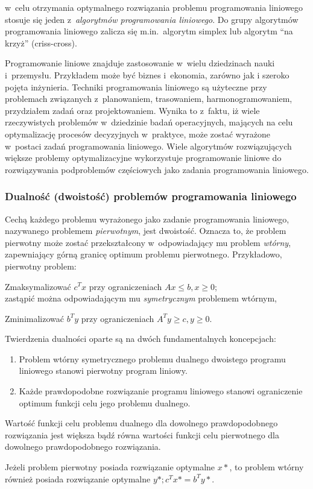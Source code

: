 \par{
  w~celu otrzymania optymalnego rozwiązania problemu programowania liniowego
  stosuje się jeden z~\emph{algorytmów programowania liniowego}.
  Do grupy algorytmów programowania liniowego zalicza się m.in.\ algorytm
  simplex lub algorytm ``na krzyż'' (criss-cross).
}
\par{
  Programowanie liniowe znajduje zastosowanie w~wielu dziedzinach nauki i~przemysłu. 
  Przykładem może być biznes i~ekonomia, zarówno jak i szeroko pojęta inżynieria.
  Techniki programowania liniowego są użyteczne przy problemach związanych 
  z~planowaniem, trasowaniem, harmonogramowaniem, przydziałem zadań oraz
  projektowaniem.
  Wynika to z~faktu, iż wiele rzeczywistych problemów w~dziedzinie badań
  operacyjnych, mających na celu optymalizację procesów decyzyjnych w~praktyce,
  może zostać wyrażone w~postaci zadań programowania liniowego.
  Wiele algorytmów rozwiązujących większe problemy optymalizacyjne wykorzystuje
  programowanie liniowe do rozwiązywania podproblemów częściowych jako zadania 
  programowania liniowego.
}
\subsubsection{Dualność (dwoistość) problemów programowania liniowego}
\label{sss_lp_duality}
\par{
  Cechą każdego problemu wyrażonego jako zadanie programowania liniowego,
  nazywanego problemem \emph{pierwotnym}, jest dwoistość.
  Oznacza to, że problem pierwotny może zostać przekształcony w~odpowiadający mu
  problem \emph{wtórny}, zapewniający górną granicę optimum problemu
  pierwotnego. 
  Przykładowo, pierwotny problem:\par
  Zmaksymalizować $c^{T}x$ przy ograniczeniach $Ax\leq b, x \geq 0$;\\
  zastąpić można odpowiadającym mu \emph{symetrycznym} problemem wtórnym,\par
  Zminimalizować $b^{T}y$ przy ograniczeniach $A^{T}y \geq c, y \geq 0$.\\
}
\par{
  Twierdzenia dualności oparte są na dwóch fundamentalnych koncepcjach:
  \begin{enumerate}
    \item Problem wtórny symetrycznego problemu dualnego dwoistego programu
      liniowego stanowi pierwotny program liniowy.
    \item Każde prawdopodobne rozwiązanie programu liniowego stanowi
      ograniczenie optimum funkcji celu jego problemu dualnego.
  \end{enumerate}

  \begin{weakduality*}
    Wartość funkcji celu problemu dualnego dla dowolnego prawdopodobnego
    rozwiązania jest większa bądź równa wartości funkcji celu pierwotnego dla
    dowolnego prawdopodobnego rozwiązania.
  \end{weakduality*}
  \begin{strongduality*}
    Jeżeli problem pierwotny posiada rozwiązanie optymalne $x*$, to problem 
    wtórny również posiada rozwiązanie optymalne $y*; c^{T}x*=b^{T}y*$.
  \end{strongduality*}
}

